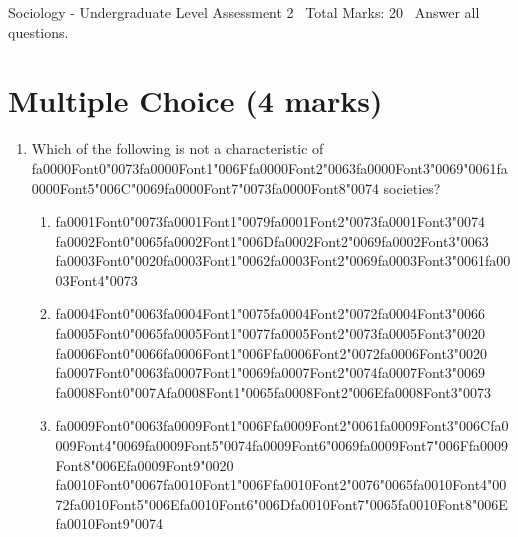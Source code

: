 \documentclass[12pt]{article}
\begin{document}
\begin{center}
Sociology - Undergraduate Level Assessment 2 \
Total Marks: 20 \
Answer all questions.
\end{center}

\section*{Multiple Choice (4 marks)}
\begin{enumerate}[label=\arabic*.]
\item Which of the following is not a characteristic of {\csname fa0000Font0\endcsname\char"0073}{\csname fa0000Font1\endcsname\char"006F}{\csname fa0000Font2\endcsname\char"0063}{\csname fa0000Font3\endcsname\char"0069}{\char"0061}{\csname fa0000Font5\endcsname\char"006C}{\char"0069}{\csname fa0000Font7\endcsname\char"0073}{\csname fa0000Font8\endcsname\char"0074} societies?
\begin{enumerate}[label=(\alph*)]
    \item {\csname fa0001Font0\endcsname\char"0073}{\csname fa0001Font1\endcsname\char"0079}{\csname fa0001Font2\endcsname\char"0073}{\csname fa0001Font3\endcsname\char"0074} {\csname fa0002Font0\endcsname\char"0065}{\csname fa0002Font1\endcsname\char"006D}{\csname fa0002Font2\endcsname\char"0069}{\csname fa0002Font3\endcsname\char"0063} {\csname fa0003Font0\endcsname\char"0020}{\csname fa0003Font1\endcsname\char"0062}{\csname fa0003Font2\endcsname\char"0069}{\csname fa0003Font3\endcsname\char"0061}{\csname fa0003Font4\endcsname\char"0073}
    \item {\csname fa0004Font0\endcsname\char"0063}{\csname fa0004Font1\endcsname\char"0075}{\csname fa0004Font2\endcsname\char"0072}{\csname fa0004Font3\endcsname\char"0066} {\csname fa0005Font0\endcsname\char"0065}{\csname fa0005Font1\endcsname\char"0077}{\csname fa0005Font2\endcsname\char"0073}{\csname fa0005Font3\endcsname\char"0020} {\csname fa0006Font0\endcsname\char"0066}{\csname fa0006Font1\endcsname\char"006F}{\csname fa0006Font2\endcsname\char"0072}{\csname fa0006Font3\endcsname\char"0020} {\csname fa0007Font0\endcsname\char"0063}{\csname fa0007Font1\endcsname\char"0069}{\csname fa0007Font2\endcsname\char"0074}{\csname fa0007Font3\endcsname\char"0069} {\csname fa0008Font0\endcsname\char"007A}{\csname fa0008Font1\endcsname\char"0065}{\csname fa0008Font2\endcsname\char"006E}{\csname fa0008Font3\endcsname\char"0073}
    \item {\csname fa0009Font0\endcsname\char"0063}{\csname fa0009Font1\endcsname\char"006F}{\csname fa0009Font2\endcsname\char"0061}{\csname fa0009Font3\endcsname\char"006C}{\csname fa0009Font4\endcsname\char"0069}{\csname fa0009Font5\endcsname\char"0074}{\csname fa0009Font6\endcsname\char"0069}{\csname fa0009Font7\endcsname\char"006F}{\csname fa0009Font8\endcsname\char"006E}{\csname fa0009Font9\endcsname\char"0020} {\csname fa0010Font0\endcsname\char"0067}{\csname fa0010Font1\endcsname\char"006F}{\csname fa0010Font2\endcsname\char"0076}{\char"0065}{\csname fa0010Font4\endcsname\char"0072}{\csname fa0010Font5\endcsname\char"006E}{\csname fa0010Font6\endcsname\char"006D}{\csname fa0010Font7\endcsname\char"0065}{\csname fa0010Font8\endcsname\char"006E}{\csname fa0010Font9\endcsname\char"0074}

\end{enumerate}
\end{enumerate}
\end{document}
